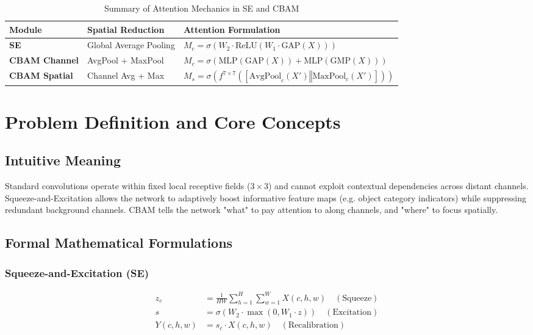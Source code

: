 \documentclass[11pt,a4paper]{article}
\theoremstyle{definition}
\begin{document}
\begin{table}[h]
\centering
\caption{Summary of Attention Mechanics in SE and CBAM}
\begin{tabular}{lll}
\toprule
\textbf{Module} & \textbf{Spatial Reduction} & \textbf{Attention Formulation} \\
\midrule
\textbf{SE} & Global Average Pooling & $M_c = \sigma(W_2 \cdot \text{ReLU}(W_1 \cdot \text{GAP}(X)))$ \\
\textbf{CBAM Channel} & AvgPool + MaxPool & $M_c = \sigma(\text{MLP}(\text{GAP}(X)) + \text{MLP}(\text{GMP}(X)))$ \\
\textbf{CBAM Spatial} & Channel Avg + Max & $M_s = \sigma(f^{7 \times 7}([\text{AvgPool}_c(X') \mathbin{\Vert} \text{MaxPool}_c(X')]))$ \\
\bottomrule
\end{tabular}
\end{table}

\section{Problem Definition and Core Concepts}

\subsection{Intuitive Meaning}
Standard convolutions operate within fixed local receptive fields ($3 \times 3$) and cannot exploit contextual dependencies across distant channels. Squeeze-and-Excitation allows the network to adaptively boost informative feature maps (e.g. object category indicators) while suppressing redundant background channels. CBAM tells the network "what" to pay attention to along channels, and "where" to focus spatially.

\subsection{Formal Mathematical Formulations}

\subsubsection{Squeeze-and-Excitation (SE)}
\begin{align}
z_c &= \frac{1}{H W} \sum_{h=1}^H \sum_{w=1}^W X(c, h, w) \quad (\text{Squeeze}) \\
s &= \sigma\left( W_2 \cdot \max(0, W_1 \cdot z) \right) \quad (\text{Excitation}) \\
Y(c, h, w) &= s_c \cdot X(c, h, w) \quad (\text{Recalibration})
\end{align}
\end{document}
